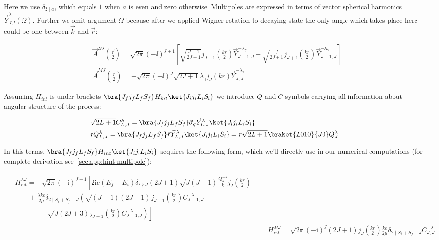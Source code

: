 Here we use $\delta_{2 \mid a}$, which equals $1$ when $a$ is even and zero otherwise. Multipoles are expressed in terms of vector spherical harmonics $\vec{Y}^\lambda_{J, l}(\Omega)$. Further we omit argument $\Omega$ because after we applied Wigner rotation to decaying state the only angle which takes place here could be one between $\vec{k}$ and $\vec{r}$:

\begin{align}
    &\vec{A}^{EJ}(\frac{\vec{r}}{2}) = \sqrt{2\pi} (-\ii)^{J+1} \left[ \sqrt{\frac{J+1}{2J+1}} j_{J-1}(\frac{kr}{2}) \vec{Y}^{-\lambda_\gamma}_{J-1, J} - \sqrt{\frac{J}{2J+1}} j_{J+1}(\frac{kr}{2}) \vec{Y}^{-\lambda_\gamma}_{J+1, J} \right] \\
    &\vec{A}^{MJ}(\frac{\vec{r}}{2}) = -\sqrt{2\pi} (-\ii)^J \sqrt{2J+1} \lambda_\gamma j_J(k r) \vec{Y}^{-\lambda_\gamma}_{J,J}
\end{align}

Assuming $H_{int}$ is under brackets $\bra{J_f j_f L_f S_f} H_{int} \ket{J_i j_i L_i S_i}$  we introduce $Q$ and $C$ symbols carrying all information about angular structure of the process:

\begin{align}
    &\sqrt{2L+1} C^\lambda_{L, J} = \bra{J_f j_j L_f S_f} \vec{\sigma}_q \vec{Y}^{\lambda}_{L, J} \ket{J_i j_i L_i S_i} \\
    &r Q^{\lambda}_{L, J} = \bra{J_f j_j L_f S_f} \vec{r} \vec{Y}^{\lambda}_{L, J} \ket{J_i j_i L_i S_i} = r \sqrt{2L+1} \braket{L010}{J0} Q^\lambda_J
\end{align}

In this terms, $\bra{J_f j_f L_f S_f} H_{int} \ket{J_i j_i L_i S_i}$ acquires the following form, which we'll directly use in our numerical computations (for complete derivation see~\cref{sec:app:hint-multipole}):

\begin{align}
    \begin{split}
        &H_{int}^{EJ} = -\sqrt{2\pi} (- \mathrm{i})^{J+1} \left[ 2 \mathrm{i} e (E_f-E_i) \delta_{2 \nmid J} (2J+1) \sqrt{J(J+1)} \frac{Q_{J}^{- \lambda}}{k} j_{J}(\frac{kr}{2}) + \right.\\
        &\qquad +  \frac{\lambda k e}{2 \mu} \delta_{2 \mid S_i + S_f + J} \left(  \sqrt{(J+1)(2J-1)} j_{J-1}(\frac{kr}{2}) C_{J-1, J}^{- \lambda} -\right. \\
        &\qquad\qquad\left.\left.- \sqrt{J(2J+3)} j_{J+1}(\frac{kr}{2}) C_{J+1, J}^{- \lambda} \right) \right]
    \end{split} \\
    &H_{int}^{MJ} = \sqrt{2\pi} (- \mathrm{i})^{J} (2J+1) j_J(\frac{kr}{2}) \frac{k e}{2 \mu} \delta_{2 \nmid S_i + S_f +J} C_{J, J}^{- \lambda}
\end{align}

